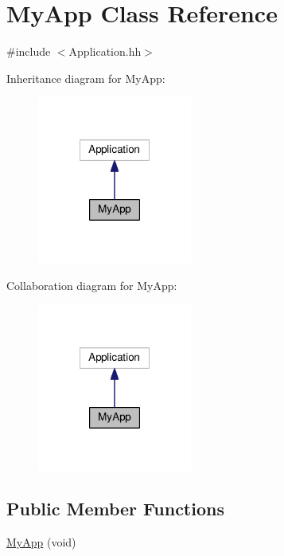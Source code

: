 \hypertarget{classMyApp}{\section{My\-App Class Reference}
\label{classMyApp}
}


{\ttfamily \#include $<$Application.\-hh$>$}



Inheritance diagram for My\-App\-:
\nopagebreak
\begin{figure}[H]
\begin{center}
\leavevmode
\includegraphics[width=144pt]{classMyApp__inherit__graph}
\end{center}
\end{figure}


Collaboration diagram for My\-App\-:
\nopagebreak
\begin{figure}[H]
\begin{center}
\leavevmode
\includegraphics[width=144pt]{classMyApp__coll__graph}
\end{center}
\end{figure}
\subsection*{Public Member Functions}
\begin{DoxyCompactItemize}
\item 
\hyperlink{classMyApp_a9a9841f1e420ab6de44d3dc1fff55ec6}{My\-App} (void)
\end{DoxyCompactItemize}


